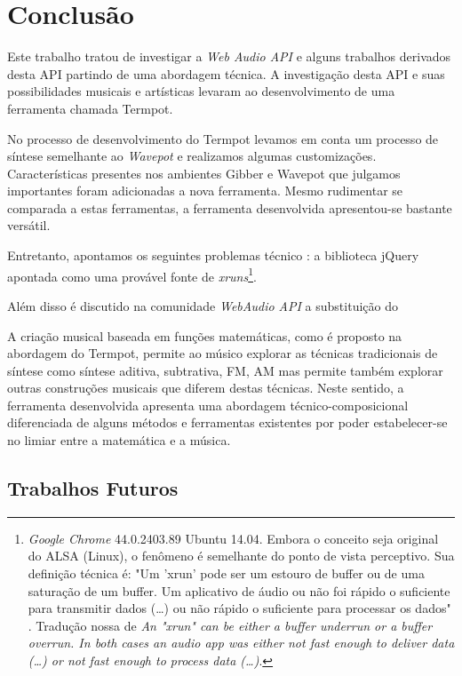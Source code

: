 \section{Conclusão}\label{sec:conclusao}

Este trabalho tratou de investigar a \emph{Web Audio API} e alguns trabalhos derivados desta API partindo de uma abordagem técnica.
A investigação desta API e suas possibilidades musicais e artísticas levaram ao desenvolvimento de uma ferramenta chamada Termpot.

No processo de desenvolvimento do Termpot levamos em conta um processo de síntese semelhante ao \emph{Wavepot} e realizamos algumas customizações.
Características presentes nos ambientes Gibber e Wavepot que julgamos importantes foram adicionadas a nova ferramenta.
Mesmo rudimentar se comparada a estas ferramentas, a ferramenta desenvolvida apresentou-se bastante versátil.

Entretanto, apontamos os seguintes problemas técnico : a biblioteca jQuery apontada como uma provável fonte de \emph{xruns}\footnote{\emph{Google Chrome} 44.0.2403.89 Ubuntu 14.04. Embora o conceito seja original do ALSA (Linux), o fenômeno é semelhante do ponto de vista perceptivo. Sua definição técnica é: "Um 'xrun' pode ser um estouro de buffer ou de uma saturação de um buffer. Um aplicativo de áudio ou não foi rápido o suficiente para transmitir dados (\ldots) ou não rápido o suficiente para processar os dados" \cite{markc_xruns_2013}. Tradução nossa de \emph{An "xrun" can be either a buffer underrun or a buffer overrun. In both cases an audio app was either not fast enough to deliver data (\ldots)  or not fast enough to process data (\ldots)}.}.

Além disso é discutido na comunidade \emph{WebAudio API} a substituição do 


A criação musical baseada em funções matemáticas, como é proposto na abordagem do Termpot, permite ao músico explorar as técnicas tradicionais de síntese como síntese aditiva, subtrativa, FM, AM mas permite também explorar outras construções musicais que diferem destas técnicas.
Neste sentido, a ferramenta desenvolvida apresenta uma abordagem técnico-composicional diferenciada de alguns métodos e ferramentas existentes por poder estabelecer-se no limiar entre a matemática e a música.



\subsection{Trabalhos Futuros}

